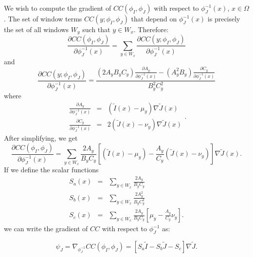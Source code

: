 We wish to compute the gradient of $CC(\phi_{I}, \phi_{J})$ with respect to $\phi^{-1}_{J}(x)$, $x\in\Omega$. The set of window terms $CC(y;\phi_{I}, \phi_{J})$
that depend on $\phi^{-1}_{J}(x)$ is precisely the set of all windows $W_{y}$ such that $y \in W_{x}$. Therefore:
\begin{equation}
    \frac{\partial CC (\phi_{I}, \phi_{J})}{\partial \phi^{-1}_{J}(x)} = \sum_{y \in W_{x}} \frac{\partial CC (y; \phi_{I}, \phi_{J})}{\partial \phi^{-1}_{J}(x)}
\end{equation}
and
\begin{equation}
    \frac{\partial CC (y; \phi_{I}, \phi_{J})}{\partial \phi^{-1}_{J}(x)} =
        \frac{\left(2A_{y} B_{y}C_{y}\right)\frac{\partial A_{y}}{\partial \phi^{-1}_{J}(x)} - \left(A_{y}^{2}B_{y}\right)\frac{\partial C_{y}}{\partial \phi^{-1}_{J}(x)}}
             {B_{y}^{2} C_{y}^{2}}
\end{equation}
where
\begin{equation}
    \begin{array}{lll}
        \frac{\partial A_{y}}{\partial \phi^{-1}_{J}(x)} &=& (\tilde{I}(x) - \mu_{y})\nabla \tilde{J}(x)\\[+3mm]
        \frac{\partial C_{y}}{\partial \phi^{-1}_{J}(x)} &=& 2(\tilde{J}(x) - \nu_{y})\nabla \tilde{J}(x)
    \end{array}.
\end{equation}
After simplifying, we get
\begin{equation}\label{eq:CC_gradient}
    \frac{\partial CC (\phi_{I}, \phi_{J})}{\partial \phi^{-1}_{J}(x)} = \sum_{y \in W_{x}}
         \frac{2A_{y}}
              {B_{y}C_{y}}\left[ (\tilde{I}(x) - \mu_{y}) - \frac{A_{y}}{C_{y}}\left(\tilde{J}(x) - \nu_{y}\right)\right]\nabla \tilde{J}(x).
\end{equation}
If we define the scalar functions
\begin{equation}
    \begin{array}{lll}
        S_{a}(x) &=& \sum_{y \in W_{x}} \frac{2A_{y}}{B_{y}C_{y}}\\[+2mm]
        S_{b}(x) &=& \sum_{y \in W_{x}} \frac{2A_{y}^{2}}{B_{y}C_{y}^{2}}\\[+2mm]
        S_{c}(x) &=& \sum_{y \in W_{x}} \frac{2A_{y}}{B_{y}C_{y}} \left[ \mu_{y} - \frac{A_{y}}{C_{y}}\nu_{y}\right].
    \end{array}
\end{equation}
we can write the gradient of $CC$ with respect to $\phi^{-1}_{J}$ as:

\begin{equation}
    \psi_{J} = \nabla_{\phi^{-1}_{J}} CC(\phi_{I}, \phi_{J}) = \left[S_{a} \tilde{I} - S_{b}\tilde{J} - S_{c}\right]\nabla \tilde{J}.
\end{equation}

